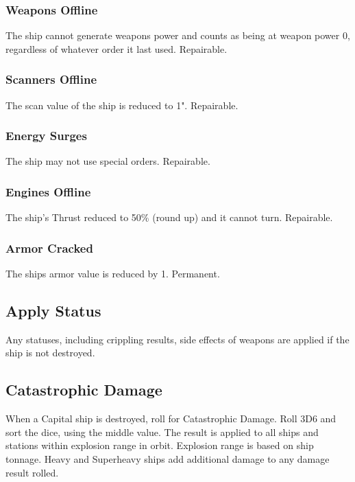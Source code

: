 \subsubsection{Weapons Offline}
The ship cannot generate weapons power and counts as being at weapon power 0, regardless of whatever order it last used. Repairable.

\subsubsection{Scanners Offline}
The scan value of the ship is reduced to 1". Repairable.

\subsubsection{Energy Surges}
The ship may not use special orders. Repairable.

\subsubsection{Engines Offline}
The ship's Thrust reduced to 50\% (round up) and it cannot turn. Repairable.

\subsubsection{Armor Cracked}
The ships armor value is reduced by 1. Permanent.

\subsection{Apply Status}
Any statuses, including crippling results, side effects of weapons are applied if the ship is not destroyed.

\subsection{Catastrophic Damage}
When a Capital ship is destroyed, roll for Catastrophic Damage. Roll 3D6 and sort the dice, using the middle value. The result is applied to all ships and stations within explosion range in orbit. Explosion range is based on ship tonnage. Heavy and Superheavy ships add additional damage to any damage result rolled.

